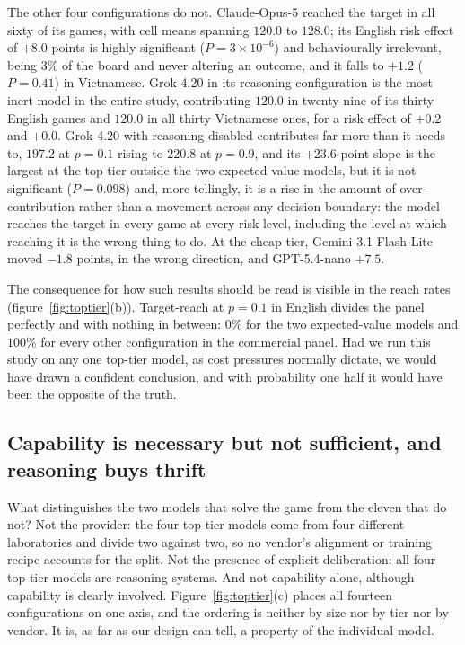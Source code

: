 \documentclass[openacc]{rsproca_new}
\begin{document}
The other four configurations do not. Claude-Opus-5 reached the target in all sixty of its games, with cell means spanning $120.0$ to $128.0$; its English risk effect of $+8.0$ points is highly significant ($P=3\times10^{-6}$) and behaviourally irrelevant, being $3\%$ of the board and never altering an outcome, and it falls to $+1.2$ ($P=0.41$) in Vietnamese. Grok-4.20 in its reasoning configuration is the most inert model in the entire study, contributing $120.0$ in twenty-nine of its thirty English games and $120.0$ in all thirty Vietnamese ones, for a risk effect of $+0.2$ and $+0.0$. Grok-4.20 with reasoning disabled contributes far more than it needs to, $197.2$ at $p=0.1$ rising to $220.8$ at $p=0.9$, and its $+23.6$-point slope is the largest at the top tier outside the two expected-value models, but it is not significant ($P=0.098$) and, more tellingly, it is a rise in the amount of over-contribution rather than a movement across any decision boundary: the model reaches the target in every game at every risk level, including the level at which reaching it is the wrong thing to do. At the cheap tier, Gemini-3.1-Flash-Lite moved $-1.8$ points, in the wrong direction, and GPT-5.4-nano $+7.5$.

The consequence for how such results should be read is visible in the reach rates (figure~\ref{fig:toptier}(b)). Target-reach at $p=0.1$ in English divides the panel perfectly and with nothing in between: $0\%$ for the two expected-value models and $100\%$ for every other configuration in the commercial panel. Had we run this study on any one top-tier model, as cost pressures normally dictate, we would have drawn a confident conclusion, and with probability one half it would have been the opposite of the truth.

\subsection{Capability is necessary but not sufficient, and reasoning buys thrift}
\label{sec:contrasts}
What distinguishes the two models that solve the game from the eleven that do not? Not the provider: the four top-tier models come from four different laboratories and divide two against two, so no vendor's alignment or training recipe accounts for the split. Not the presence of explicit deliberation: all four top-tier models are reasoning systems. And not capability alone, although capability is clearly involved. Figure~\ref{fig:toptier}(c) places all fourteen configurations on one axis, and the ordering is neither by size nor by tier nor by vendor. It is, as far as our design can tell, a property of the individual model.
\end{document}
